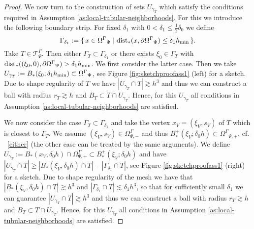 \documentclass[final]{siamltex}
\begin{document}
\begin{proof}
 We now turn to the construction of sets $U_{\gamma_T}$ which satisfy the conditions required in Assumption \ref{as:local-tubular-neighborhoods}. For this we introduce the following boundary strip. For fixed $\delta_1$ with $0< \delta_1 \leq \frac12 \delta_0$ we define
 \[
  \Gamma_{\delta_1}:= \{\, x \in {\Omega^{\Gamma}}_\Psi \mid {\rm dist}_\ast(x, \partial{\Omega^{\Gamma}}_\Psi) \leq \delta_1 h_{\min}\,\}.
 \]
Take $T \in {\mathcal{T}}^\Gamma_\Psi$. Then either $\Gamma_T \subset \Gamma_{\delta_1}$ or there exists $\xi_0 \in \Gamma_T$ with ${\rm dist}_\ast((\xi_0,0), \partial{\Omega^{\Gamma}}_\Psi) > \delta_1 h_{\min}$.
We first consider the latter case. Then we take $U_{\gamma_T}:=B_\ast(\xi_0;\delta_1 h_{\rm min}) \subset {\Omega^{\Gamma}}_\Psi$, see Figure \ref{fig:sketchproofass1} (left) for a sketch.
Due to shape regularity of $T$ we have $|U_{\gamma_T} \cap T| \gtrsim h^3$ and thus we can construct a ball with radius $r_T \gtrsim h$ and $B_T \subset T \cap U_{\gamma_T}$. Hence, for this $U_{\gamma_T}$ all conditions in Assumption \ref{as:local-tubular-neighborhoods} are satisfied. 

We now consider the case $\Gamma_T \subset \Gamma_{\delta_1}$ and take the vertex $x_V = (\xi_V,s_V)$ of $T$ which is closest to $\Gamma_T$. 
We assume $(\xi_V,s_V) \in \Omega_{\Psi,-}^\Gamma$ and thus $B_\ast^+(\xi_V;\delta_0 h) \subset {\Omega^{\Gamma}}_{\Psi,+}$, cf. ~\eqref{either} (the other case can be treated by the same arguments). 
We define $U_{\gamma_T} := B_\ast(x_V,\delta_0 h) \cap \Omega_{\Psi,+}^\Gamma \subset B_\ast^+(\xi_V;\delta_0 h)$
and have
$ |U_{\gamma_T} \cap T| \geq |B_\ast(\xi_V,\delta_0 h) \cap T| - | \Gamma_{\delta_1} \cap T|$, see Figure \ref{fig:sketchproofass1} (right) for a sketch. Due to shape regularity of the mesh we have that $|B_\ast(\xi_V,\delta_0 h) \cap T| \gtrsim h^3$ and $| \Gamma_{\delta_1} \cap T| \lesssim \delta_1 h^3$, so that for sufficiently small $\delta_1$ we can guarantee $|U_{\gamma_T} \cap T| \gtrsim h^3$ and thus we can construct a ball with radius $r_T \gtrsim h$ and $B_T \subset T \cap U_{\gamma_T}$. Hence, for this $U_{\gamma_T}$ all conditions in Assumption \ref{as:local-tubular-neighborhoods} are satisfied. 
\end{proof}
\end{document}
